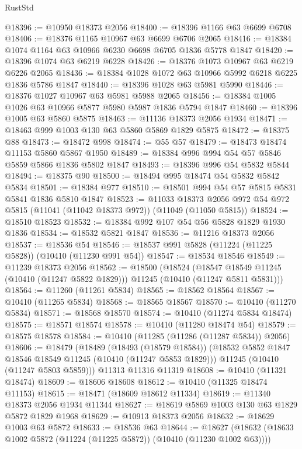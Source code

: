 \begin{lexlean}{RustStd}
\begin{coremodule}
@18396 := @10950 @18373 @2056
@18400 := @18396 @1166 @63 @6699 @6708
@18406 := @18376 @1165 @10967 @63 @6699 @6706 @2065
@18416 := @18384 @1074 @1164 @63 @10966 @6230 @6698 @6705 @1836 @5778 @1847
@18420 := @18396 @1074 @63 @6219 @6228
@18426 := @18376 @1073 @10967 @63 @6219 @6226 @2065
@18436 := @18384 @1028 @1072 @63 @10966 @5992 @6218 @6225 @1836 @5786 @1847
@18440 := @18396 @1028 @63 @5981 @5990
@18446 := @18376 @1027 @10967 @63 @5981 @5988 @2065
@18456 := @18384 @1005 @1026 @63 @10966 @5877 @5980 @5987 @1836 @5794 @1847
@18460 := @18396 @1005 @63 @5860 @5875
@18463 := @11136 @18373 @2056 @1934
@18471 := @18463 @999 @1003 @130 @63 @5860 @5869 @1829 @5875
@18472 := @18375 @88
@18473 := @18472 @998
@18474 := @55 @57
@18479 := @18473 @18474 @11153 @5860 @5867 @1950
@18489 := @18384 @996 @994 @54 @57 @5846 @5859 @5866 @1836 @5802 @1847
@18493 := @18396 @996 @54 @5832 @5844
@18494 := @18375 @90
@18500 := @18494 @995 @18474 @54 @5832 @5842 @5834
@18501 := @18384 @977
@18510 := @18501 @994 @54 @57 @5815 @5831 @5841 @1836 @5810 @1847
@18523 := @11033
    @18373
    @2056
    @972
    @54
    @972
    @5815
    (@11041 (@11042 @18373 @972))
    (@11049 (@11050 @5815))
@18524 := @18510 @18523
@18532 := @18384 @992 @107 @54 @56 @5828 @1829 @1930 @1836
@18534 := @18532 @5821 @1847
@18536 := @11216 @18373 @2056
@18537 := @18536 @54
@18546 := @18537 @991 @5828 (@11224 (@11225 @5828)) (@10410 (@11230 @991 @54))
@18547 := @18534 @18546
@18549 := @11239 @18373 @2056
@18562 := @18500
    (@18524
      (@18547 @18549 @11245 (@10410 (@11247 @5822 @1829)))
      @11245
      (@10410 (@11247 @5811 @5831)))
@18564 := @11260 (@11261 @5834)
@18565 := @18562 @18564
@18567 := @10410 (@11265 @5834)
@18568 := @18565 @18567
@18570 := @10410 (@11270 @5834)
@18571 := @18568 @18570
@18574 := @10410 (@11274 @5834 @18474)
@18575 := @18571 @18574
@18578 := @10410 (@11280 @18474 @54)
@18579 := @18575 @18578
@18584 := @10410 (@11285 (@11286 (@11287 @5834)) @2056)
@18606 := @18479
    (@18489
      (@18493 (@18579 @18584))
      (@18532 @5852 @1847 @18546 @18549 @11245 (@10410 (@11247 @5853 @1829)))
      @11245
      (@10410 (@11247 @5803 @5859)))
    @11313
    @11316
    @11319
@18608 := @10410 (@11321 @18474)
@18609 := @18606 @18608
@18612 := @10410 (@11325 @18474 @11153)
@18615 := @18471 (@18609 @18612 @11334)
@18619 := @11340 @18373 @2056 @1934 @11344
@18627 := @18619 @5869 @1003 @130 @63 @1829 @5872 @1829 @1968
@18629 := @10913 @18373 @2056
@18632 := @18629 @1003 @63 @5872
@18633 := @18536 @63
@18644 := @18627 (@18632 (@18633 @1002 @5872 (@11224 (@11225 @5872)) (@10410 (@11230 @1002 @63))))

\end{coremodule}
\end{lexlean}

